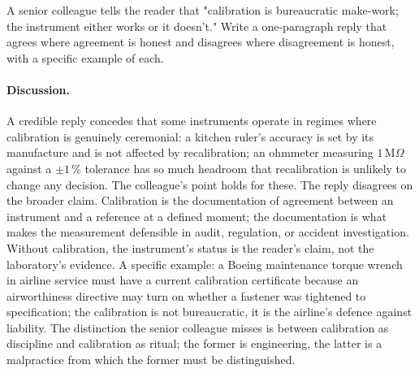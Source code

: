 \begin{exercise}
A senior colleague tells the reader that "calibration is bureaucratic
make-work; the instrument either works or it doesn't." Write a
one-paragraph reply that agrees where agreement is honest and
disagrees where disagreement is honest, with a specific example of
each.

\paragraph{Discussion.} A credible reply concedes that some
instruments operate in regimes where calibration is genuinely
ceremonial: a kitchen ruler's accuracy is set by its manufacture
and is not affected by recalibration; an ohmmeter measuring
$1 \,\text{M}\Omega$ against a $\pm 1\,\%$ tolerance has so much
headroom that recalibration is unlikely to change any decision.
The colleague's point holds for these. The reply disagrees on the
broader claim. Calibration is the documentation of agreement
between an instrument and a reference at a defined moment; the
documentation is what makes the measurement defensible in
audit, regulation, or accident investigation. Without calibration,
the instrument's status is the reader's claim, not the laboratory's
evidence. A specific example: a Boeing maintenance torque wrench
in airline service must have a current calibration certificate
because an airworthiness directive may turn on whether a fastener
was tightened to specification; the calibration is not
bureaucratic, it is the airline's defence against liability. The
distinction the senior colleague misses is between calibration as
discipline and calibration as ritual; the former is engineering,
the latter is a malpractice from which the former must be
distinguished.
\end{exercise}

